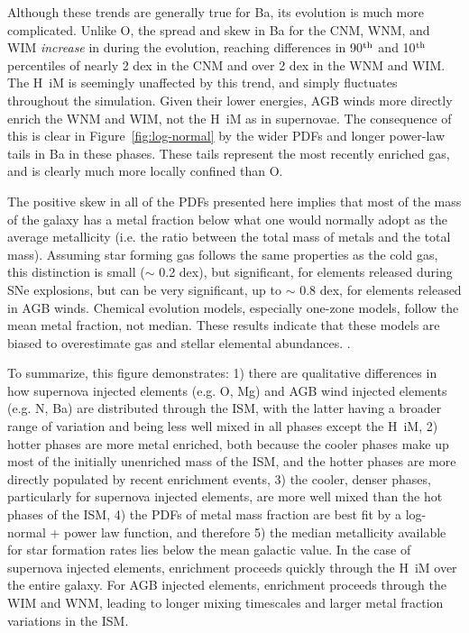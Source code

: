 \documentclass[twocolumn]{aastex61}
\begin{document}

Although these trends are generally true for Ba, its evolution is much more complicated.
Unlike O, the spread and skew in Ba for the CNM, WNM, and WIM \textit{increase} in during the evolution, reaching differences in 90$^{\rm th}$ and 10$^{\rm th}$ percentiles of nearly 2 dex in the CNM and over 2 dex in the WNM and WIM. The H~{\sc i}M is seemingly unaffected by this trend, and simply fluctuates throughout the simulation. Given their lower energies, AGB winds more directly enrich the WNM and WIM, not the H~{\sc i}M as in supernovae. The consequence of this is clear in Figure~\ref{fig:log-normal} by the wider PDFs and longer power-law tails in Ba in these phases. These tails represent the most recently enriched gas, and is clearly much more locally confined than O. 

The positive skew in all of the PDFs presented here implies that most of the mass of the galaxy has a metal fraction below what one would normally adopt as the average metallicity (i.e. the ratio between the total mass of metals and the total mass). Assuming star forming gas follows the same properties as the cold gas, this distinction is small ($\sim$ 0.2 dex), but significant, for elements released during SNe explosions, but can be very significant, up to $\sim$ 0.8 dex, for elements released in AGB winds. Chemical evolution models, especially one-zone models, follow the mean metal fraction, not median. These results indicate that these models are biased to overestimate gas and stellar elemental abundances.
. %

To summarize, this figure demonstrates: 1) there are qualitative differences in how supernova injected elements (e.g. O, Mg) and AGB wind injected elements (e.g. N, Ba) are distributed through the ISM, with the latter having a broader range of variation and being less well mixed in all phases except the H~{\sc i}M, 2) hotter phases are more metal enriched, both because the cooler phases make up most of the initially unenriched mass of the ISM, and the hotter phases are more directly populated by recent enrichment events, 3) the cooler, denser phases, particularly for supernova injected elements, are more well mixed than the hot phases of the ISM, 4) the PDFs of metal mass fraction are best fit by a log-normal + power law function, and therefore 5) the median metallicity available for star formation rates lies below the mean galactic value. In the case of supernova injected elements, enrichment proceeds quickly through the H~{\sc i}M over the entire galaxy. For AGB injected elements, enrichment proceeds through the WIM and WNM, leading to longer mixing timescales and larger metal fraction variations in the ISM. 
\end{document}

